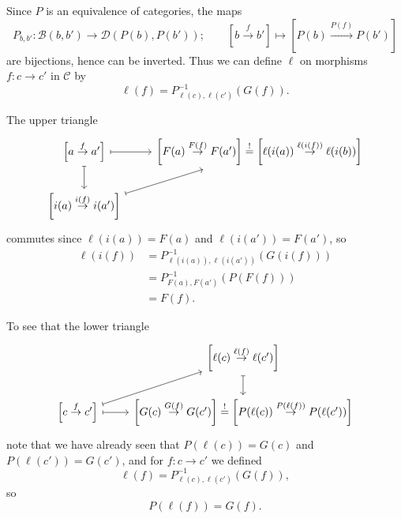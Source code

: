 \documentclass[main.tex]{subfiles}
\begin{document}
Since $P$ is an equivalence of categories, the maps
\begin{equation*}
  P_{b, b'}\colon \mathcal{B}(b, b') \to \mathcal{D}(P(b),P(b'));\qquad \left[ b \overset{f}{\to} b' \right] \mapsto \left[ P(b) \overset{P(f)}{\to} P(b') \right]
\end{equation*}
are bijections, hence can be inverted. Thus we can define $\ell$ on morphisms $f\colon c \to c'$ in $\mathcal{C}$ by
\begin{equation*}
  \ell(f) = P^{-1}_{\ell(c), \ell(c')}(G(f)).
\end{equation*}

The upper triangle
\begin{equation*}
  \begin{tikzcd}
    \left[ a \overset{f}{\to} a' \right]
    \arrow[r, mapsto]
    \arrow[d, mapsto]
    & \left[ F(a)\overset{F(f)}{\to} F(a') \right] \overset{!}{=} \left[ \ell(i(a))\overset{\ell(i(f))}{\to}\ell(i(b)) \right]
    \\
    \left[ i(a)\overset{i(f)}{\to} i(a') \right]
    \arrow[ur, mapsto]
  \end{tikzcd}
\end{equation*}
commutes since $\ell(i(a)) = F(a)$ and $\ell(i(a')) = F(a')$, so
\begin{align*}
  \ell(i(f)) &= P^{-1}_{\ell(i(a)), \ell(i(a'))}(G(i(f))) \\
  &= P^{-1}_{F(a),F(a')}(P(F(f))) \\
  &= F(f).
\end{align*}

To see that the lower triangle
\begin{equation*}
  \begin{tikzcd}
    & \left[ \ell(c) \overset{\ell(f)}{\to} \ell(c') \right]
    \arrow[d, mapsto]
    \\
    \left[ c \overset{f}{\to} c' \right]
    \arrow[ur, mapsto]
    \arrow[r, mapsto]
    & \left[ G(c) \overset{G(f)}{\to} G(c') \right] \overset{!}{=} \left[ P(\ell(c)) \overset{P(\ell(f))}{\to} P(\ell(c')) \right]
  \end{tikzcd}
\end{equation*}
note that we have already seen that $P(\ell(c)) = G(c)$ and $P(\ell(c')) = G(c')$, and for $f\colon c \to c'$ we defined
\begin{equation*}
  \ell(f) = P^{-1}_{\ell(c), \ell(c')}(G(f)),
\end{equation*}
so
\begin{equation*}
  P(\ell(f)) = G(f).
\end{equation*}
\end{document}
